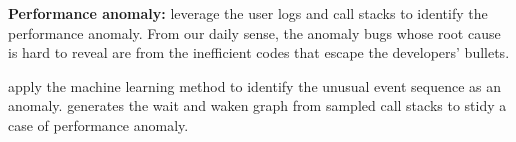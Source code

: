 \textbf{Performance anomaly:}\cite{} leverage the user logs and call stacks to identify the performance anomaly.         
From our daily sense, the anomaly bugs whose root cause is hard to reveal are from the inefficient codes that escape the developers' bullets.                                                                                                        
                                                                                                                         
\cite{} apply the machine learning method to identify the unusual event sequence as an anomaly.
\cite{} generates the wait and waken graph from sampled call stacks to stidy a case of performance anomaly.
